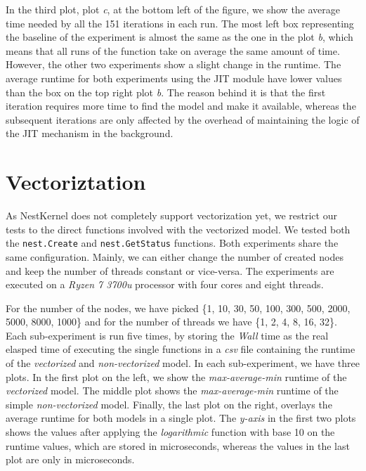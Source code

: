 In the third plot, plot \emph{c}, at the bottom left of the figure, we show the average time needed by all the 151 iterations in each run. The most left box representing the baseline of the experiment is almost the same as the one in the plot \emph{b}, which means that all runs of the function take on average the same amount of time. However, the other two experiments show a slight change in the runtime. The average runtime for both experiments using the JIT module have lower values than the box on the top right plot \emph{b}. The reason behind it is that the first iteration requires more time to find the model and make it available, whereas the subsequent iterations are only affected by the overhead of maintaining the logic of the JIT mechanism in the background.



\section{Vectoriztation}

As NestKernel does not completely support vectorization yet, we restrict our tests to the direct functions involved with the vectorized model. We tested both the \texttt{nest.Create} and \texttt{nest.GetStatus} functions. Both experiments share the same configuration. Mainly, we can either change the number of created nodes and keep the number of threads constant or vice-versa. The experiments are executed on a \emph{Ryzen 7 3700u} processor with four cores and eight threads.

For the number of the nodes, we have picked \{1, 10, 30, 50, 100, 300, 500, 2000, 5000, 8000, 1000\} and for the number of threads we have \{1, 2, 4, 8, 16, 32\}. Each sub-experiment is run five times, by storing the \emph{Wall} time as the real elasped time of executing the single functions in a \emph{csv} file containing the runtime of the \emph{vectorized} and \emph{non-vectorized} model. In each sub-experiment, we have three plots. In the first plot on the left, we show the \emph{max-average-min} runtime of the \emph{vectorized} model. The middle plot shows the \emph{max-average-min} runtime of the simple \emph{non-vectorized} model. Finally, the last plot on the right, overlays the average runtime for both models in a single plot. The \emph{y-axis} in the first two plots shows the values after applying the \emph{logarithmic} function with base 10 on the runtime values, which are stored in microseconds, whereas the values in the last plot are only in microseconds.

